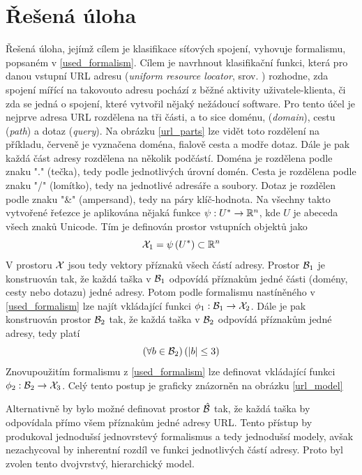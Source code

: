 \section{Řešená úloha}
Řešená úloha, jejímž cílem je klasifikace síťových spojení, vyhovuje formalismu, popsaném v \ref{used_formalism}. Cílem je navrhnout klasifikační funkci, která pro danou vstupní URL adresu (\textit{\textenglish{uniform resource locator}}, srov. \cite{berners-lee_uniform_1994}) rozhodne, zda spojení mířící na takovouto adresu pochází z běžné aktivity uživatele-klienta, či zda se jedná o spojení, které vytvořil nějaký nežádoucí software. Pro tento účel je nejprve adresa URL rozdělena na tři části, a to sice doménu, (\textit{\textenglish{domain}}), cestu (\textit{\textenglish{path}}) a dotaz (\textit{\textenglish{query}}). Na obrázku \ref{url_parts} lze vidět toto rozdělení na příkladu, červeně je vyznačena doména, fialově cesta a modře dotaz. Dále je pak každá část adresy rozdělena na několik podčástí. Doména je rozdělena podle znaku "." (tečka), tedy podle jednotlivých úrovní domén. Cesta je rozdělena podle znaku "/" (lomítko), tedy na jednotlivé adresáře a soubory. Dotaz je rozdělen podle znaku "\&" (ampersand), tedy na páry klíč-hodnota. Na všechny takto vytvořené řeťezce je aplikována nějaká funkce \( \psi : U^* \to \mathbb R^n \), kde \( U \) je abeceda všech znaků Unicode. Tím je definován prostor vstupních objektů jako
\begin{equation}
	\mathcal X_1 = \psi \left( U^* \right) \subset \mathbb R^n
\end{equation}
V prostoru \( \mathcal X \) jsou tedy vektory příznaků všech částí adresy. Prostor \( \mathcal B_1 \) je konstruován tak, že každá taška v \( \mathcal B_1 \) odpovídá příznakům jedné části (domény, cesty nebo dotazu) jedné adresy. Potom podle formalismu nastíněného v \ref{used_formalism} lze najít vkládající funkci \( \phi_1 : \mathcal B_1 \to \mathcal X_2 \). Dále je pak konstruován prostor \( \mathcal B_2 \) tak, že každá taška v \( \mathcal B_2 \) odpovídá příznakům jedné adresy, tedy platí
\begin{equation}
	\left( \forall b \in \mathcal B_2 \right) \left( \left| b \right| \leq 3 \right)
\end{equation}
Znovupoužitím formalismu z \ref{used_formalism} lze definovat vkládající funkci \( \phi_2 : \mathcal B_2 \to \mathcal X_3 \). Celý tento postup je graficky znázorněn na obrázku \ref{url_model}

Alternativně by bylo možné definovat prostor \( \hat{\mathcal B} \) tak, že každá taška by odpovídala přímo všem příznakům jedné adresy URL. Tento přístup by produkoval jednodušsí jednovrstevý formalismus a tedy jednodušsí modely, avšak nezachycoval by inherentní rozdíl ve funkci jednotlivých částí adresy. Proto byl zvolen tento dvojvrstvý, hierarchický model.

